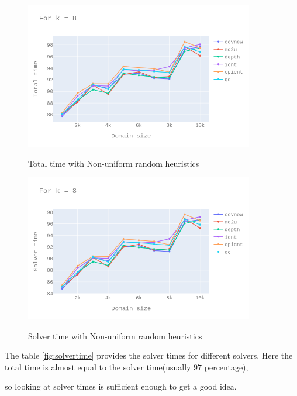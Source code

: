 \documentclass[11pt,a4paper,notitlepage]{article}
\begin{document}
\begin{figure}[h]
\centering
\includegraphics[width=10cm]{k_8_tt_nonuni_heur.png}
\label{fig:nonuni_heur_tt}
\caption{Total time with Non-uniform random heuristics}
\centering
\end{figure}

\begin{figure}[h]
\centering
\includegraphics[width=10cm]{k_8_st_nonuni_heur.png}
\label{fig:nonuni_heur_st}
\caption{Solver time with Non-uniform random heuristics}
\centering
\end{figure}

The table \ref{fig:solvertime} provides the solver times for different solvers.
Here the total time is almost equal to the solver time(usually $97$ percentage),

so looking at solver times is sufficient enough to get a good idea.
\end{document}
